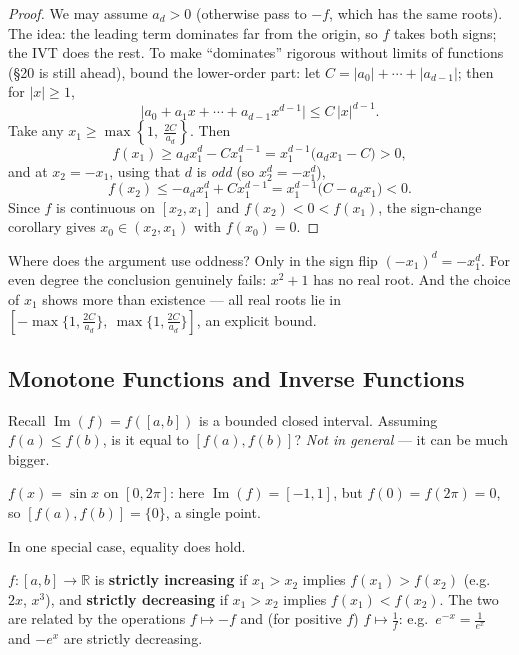 \documentclass[11pt]{report}
\begin{document}
\begin{proof}
We may assume $a_d > 0$ (otherwise pass to $-f$, which has the same roots). The idea: the leading term dominates far from the origin, so $f$ takes both signs; the IVT does the rest. To make ``dominates'' rigorous without limits of functions (\S 20 is still ahead), bound the lower-order part: let $C = |a_0| + \cdots + |a_{d-1}|$; then for $|x| \geq 1$,
\[
\bigl| a_0 + a_1 x + \cdots + a_{d-1} x^{d-1} \bigr| \leq C\,|x|^{d-1}.
\]
Take any $x_1 \geq \max\left\{ 1,\ \tfrac{2C}{a_d} \right\}$. Then
\[
f(x_1) \geq a_d x_1^{d} - C x_1^{d-1} = x_1^{d-1} \bigl( a_d x_1 - C \bigr) > 0,
\]
and at $x_2 = -x_1$, using that $d$ is \emph{odd} (so $x_2^{d} = -x_1^{d}$),
\[
f(x_2) \leq -a_d x_1^{d} + C x_1^{d-1} = x_1^{d-1}\bigl( C - a_d x_1 \bigr) < 0.
\]
Since $f$ is continuous on $[x_2, x_1]$ and $f(x_2) < 0 < f(x_1)$, the sign-change corollary gives $x_0 \in (x_2, x_1)$ with $f(x_0) = 0$.
\end{proof}

\begin{rembox}
Where does the argument use oddness? Only in the sign flip $(-x_1)^d = -x_1^d$. For even degree the conclusion genuinely fails: $x^2 + 1$ has no real root. And the choice of $x_1$ shows more than existence --- all real roots lie in $\left[ -\max\{1, \tfrac{2C}{a_d}\},\ \max\{1, \tfrac{2C}{a_d}\} \right]$, an explicit bound.
\end{rembox}

\subsection{Monotone Functions and Inverse Functions}

Recall $\operatorname{Im}(f) = f([a,b])$ is a bounded closed interval. Assuming $f(a) \leq f(b)$, is it equal to $[f(a), f(b)]$? \emph{Not in general} --- it can be much bigger.

\begin{exbox}
$f(x) = \sin x$ on $[0, 2\pi]$: here $\operatorname{Im}(f) = [-1, 1]$, but $f(0) = f(2\pi) = 0$, so $[f(a), f(b)] = \{0\}$, a single point.
\end{exbox}

In one special case, equality does hold.

\begin{defbox}
$f: [a,b] \to \mathbb{R}$ is \textbf{strictly increasing} if $x_1 > x_2$ implies $f(x_1) > f(x_2)$ (e.g.\ $2x$, $x^3$), and \textbf{strictly decreasing} if $x_1 > x_2$ implies $f(x_1) < f(x_2)$. The two are related by the operations $f \mapsto -f$ and (for positive $f$) $f \mapsto \tfrac1f$: e.g.\ $e^{-x} = \tfrac{1}{e^x}$ and $-e^x$ are strictly decreasing.
\end{defbox}
\end{document}
